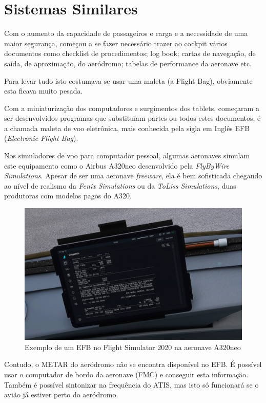 \chapter{Sistemas Similares}
Com o aumento da capacidade de passageiros e carga e a 
necessidade de uma maior 
segurança, começou a se fazer necessário trazer ao cockpit vários
documentos como checklist de procedimentos; log book; cartas de 
navegação, de saída, de aproximação, do aeródromo; tabelas de 
performance da aeronave etc. 

Para levar tudo isto costumava-se usar uma maleta (a Flight Bag),
obviamente esta ficava muito pesada.

Com a miniaturização dos computadores e surgimentos dos tablets, 
começaram a ser desenvolvidos programas que substituíam partes
ou todos estes documentos, é a chamada maleta de voo eletrônica,
mais conhecida pela sigla em Inglês EFB (\textit{Electronic Flight Bag}).

Nos simuladores de voo para computador pessoal, algumas aeronaves
simulam este equipamento como o Airbus A320neo desenvolvido pela
\textit{FlyByWire Simulations}. Apesar de ser uma aeronave \textit{freeware}, ela 
é bem sofisticada chegando ao nível de realismo da \textit{Fenix Simulations}
ou da \textit{ToLiss Simulations}, duas produtoras com modelos pagos do A320.

\begin{figure}[ht]
    \begin{center}
    \includegraphics[width=400pt]{img/efb-a320.png}
    \caption{Exemplo de um EFB no Flight Simulator 2020 na aeronave A320neo}
    \label{fig:efb-a320}
    \end{center}
\end{figure}

Contudo, o METAR do aeródromo não se encontra disponível no EFB.
É possível usar o computador de bordo da aeronave (FMC) e conseguir
esta informação. Também é possível sintonizar na frequência do ATIS,
mas isto só funcionará se o avião já estiver perto do aeródromo.

